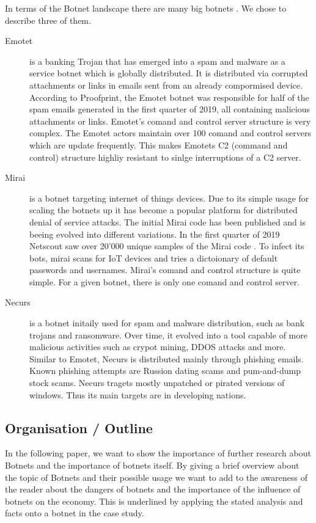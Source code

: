In terms of the Botnet landscape there are many big botnets \cite{CenturyLink19}. We chose to describe three of them. 

\begin{description}

\item[Emotet] is a banking Trojan that has emerged into a spam and malware as a service botnet which is globally distributed. It is distributed via corrupted attachments or links in emails sent from an already compormised device. According to Proofprint, the Emotet botnet was responsible for half of the spam emails generated in the first quarter of 2019, all containing malicious attachments or links. Emotet's comand and control server structure is very complex. The Emotet actors maintain over 100 comand and control servers which are update frequently. This makes Emotets C2 (command and control) structure highliy resistant to sinlge interruptions of a C2 server.\cite{CenturyLink19}

\item[Mirai] is a botnet targeting internet of things devices. Due to its simple usage for scaling the botnets up it has become a popular platform for distributed denial of service attacks. The initial Mirai code has been published and is beeing evolved into different variations. In the first quarter of 2019 Netscout saw over 20'000 unique samples of the Mirai code \cite{Netscout19}.
To infect its bots, mirai scans for IoT devices and tries a dictoionary of default passwords and usernames. Mirai's comand and control structure is quite simple. For a given botnet, there is only one comand and control server. \cite{CenturyLink19}

\item[Necurs] is a botnet initaily used for spam and malware distribution, such as bank trojans and ransomware. Over time, it evolved into a tool capable of more malicious activities such as crypot mining, DDOS attacks and more. Similar to Emotet, Necurs is distributed mainly through phishing emails. Known phishing attempts are Russion dating scams and pum-and-dump stock scams. Necurs tragets mostly unpatched or pirated versions of windows. Thus its main targets are in developing nations. \cite{CenturyLink19}

\end{description}
 


 
\subsection{Organisation / Outline}
In the following paper, we want to show the importance of further research about Botnets and the importance of botnets itself. By giving a brief overview about the topic of Botnets and their possible usage we want to add to the awareness of the reader about the dangers of botnets and the importance of the influence of botnets on the economy. This is underlined by applying the stated analysis and facts onto a botnet in the case study. 

